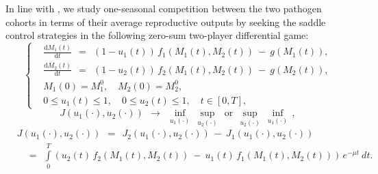 \documentclass[11pt]{amsart}
\begin{document}
In line with \cite{YegorovGrognardMailleretHalkettBernhard2019,
BernhardGrognardMailleretAkhmetzhanov2010},
we study one-seasonal competition between the two pathogen cohorts in terms of
their average reproductive outputs by seeking the 
saddle control strategies %
in the following zero-sum two-player differential game:
\begin{equation}
\left\{ \begin{aligned}
& \frac{\mathrm{d} M_1(t)}{\mathrm{d} t} \:\: = \:\: \left(1 - u_1(t)\right) \,
  f_1\left(M_1(t), M_2(t)\right) \: - \: g\left(M_1(t)\right), \\
& \frac{\mathrm{d} M_2(t)}{\mathrm{d} t} \:\: = \:\: \left(1 - u_2(t)\right) \,
  f_2\left(M_1(t), M_2(t)\right) \: - \: g\left(M_2(t)\right), \\
& M_1(0) = M_1^0, \quad M_2(0) = M_2^0, \\
& 0 \leqslant u_1(t) \leqslant 1, \quad 0 \leqslant u_2(t) \leqslant 1,
  \quad t \in [0, T],
\end{aligned} \right.  \label{7}
\end{equation}
\begin{equation}
J(u_1(\cdot), u_2(\cdot)) \:\: \longrightarrow \:\: 
\inf_{u_1(\cdot)} \:  \sup_{u_2(\cdot)} %
\:\: \mbox{or} \:\:
\sup_{u_2(\cdot)} \: \inf_{u_1(\cdot)} \, ,  \label{8}
\end{equation}
\begin{equation}
\begin{aligned}
& J\left(u_1(\cdot), u_2(\cdot)\right) \:\: = \:\: J_2\left(u_1(\cdot), u_2(\cdot)\right) \: - \:
J_1\left(u_1(\cdot), u_2(\cdot)\right) \\
& \quad
= \:\: \int\limits_0^T \left( u_2(t) \, f_2(M_1(t), M_2(t)) \: - \: u_1(t)
  \, f_1(M_1(t), M_2(t)) \right) \,
e^{-\mu t} \: dt.
\end{aligned}  \label{9}
\end{equation}
\end{document}
